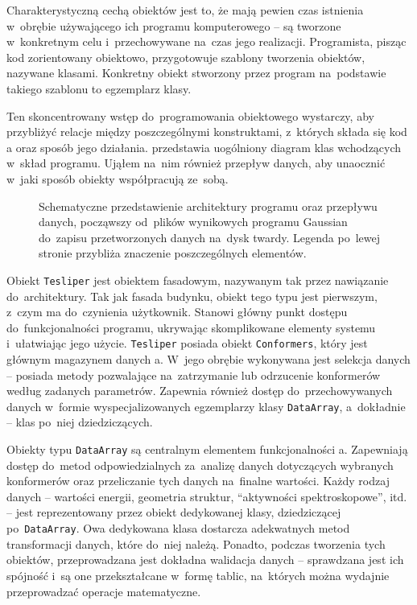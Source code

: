 Charakterystyczną cechą obiektów jest to, że mają pewien czas istnienia w~obrębie używającego ich
  programu komputerowego \--- są tworzone w~konkretnym celu i~przechowywane na~czas jego realizacji.
Programista, pisząc kod zorientowany obiektowo, przygotowuje szablony tworzenia obiektów,
  nazywane klasami.
Konkretny obiekt stworzony przez program na~podstawie takiego szablonu to egzemplarz klasy.

Ten skoncentrowany wstęp do~programowania obiektowego wystarczy, aby przybliżyć relacje między
  poszczególnymi konstruktami, z~których składa się kod \tesliper{}a oraz sposób jego działania.
 przedstawia uogólniony diagram klas wchodzących w~skład programu.
Ująłem na~nim również przepływ danych, aby unaocznić w~jaki sposób obiekty współpracują ze~sobą.

\begin{figure}
  
  \caption{
    Schematyczne przedstawienie architektury programu \tesliper{} oraz przepływu danych,
      począwszy od~plików wynikowych programu Gaussian do~zapisu przetworzonych danych
      na~dysk twardy.
    Legenda po~lewej stronie przybliża znaczenie poszczególnych elementów.
  }
  \label{fig:class-diagram}
\end{figure}

Obiekt \texttt{Tesliper} jest obiektem fasadowym, nazywanym tak przez nawiązanie do~architektury.
Tak jak fasada budynku, obiekt tego typu jest pierwszym, z~czym ma do~czynienia użytkownik.
Stanowi główny punkt dostępu do~funkcjonalności programu, ukrywając skomplikowane elementy
  systemu i~ułatwiając jego użycie.
\texttt{Tesliper} posiada obiekt \texttt{Conformers},
  który jest głównym magazynem danych \tesliper{}a.
W~jego obrębie wykonywana jest selekcja danych \--- posiada metody pozwalające
  na~zatrzymanie lub odrzucenie
  konformerów według zadanych parametrów.
Zapewnia również dostęp do~przechowywanych danych w~formie wyspecjalizowanych egzemplarzy
  klasy \texttt{DataArray}, a~dokładnie \--- klas po~niej dziedziczących.

Obiekty typu \texttt{DataArray} są centralnym elementem funkcjonalności \tesliper{}a.
Zapewniają dostęp do~metod odpowiedzialnych za~analizę danych dotyczących wybranych konformerów
  oraz przeliczanie tych danych na~finalne wartości.
Każdy rodzaj danych \--- wartości energii, geometria struktur,
  \enquote{aktywności spektroskopowe}, itd. \--- jest reprezentowany przez obiekt
  dedykowanej klasy, dziedziczącej po~\texttt{DataArray}.
Owa dedykowana klasa dostarcza adekwatnych metod transformacji danych, które do~niej należą.
Ponadto, podczas tworzenia tych obiektów, przeprowadzana jest dokładna walidacja danych \---
  sprawdzana jest ich spójność i~są one przekształcane w~formę tablic, na~których można
  wydajnie przeprowadzać operacje matematyczne.

